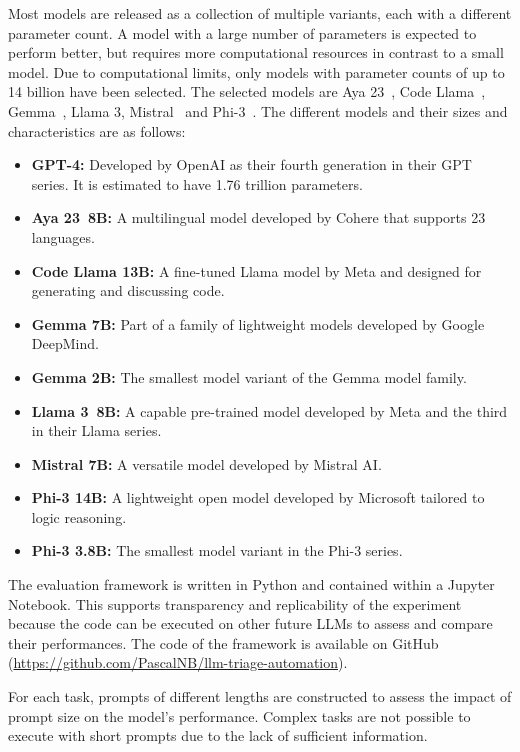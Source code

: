 Most models are released as a collection of multiple variants, each with a different parameter count.
A model with a large number of parameters is expected to perform better, but requires more computational resources
in contrast to a small model.
Due to computational limits, only models with parameter counts of up to 14 billion have been selected.
The selected models are Aya 23\ \citep{aryabumi2024aya}, Code Llama\ \citep{roziere2023code},
Gemma\ \citep{team2024gemma}, Llama 3, Mistral\ \citep{jiang2023mistral} and Phi-3\ \citep{abdin2024phi}.
The different models and their sizes and characteristics are as follows:
\begin{itemize}
    \item \textbf{GPT-4:} Developed by OpenAI as their fourth generation in their GPT series.
    It is estimated to have 1.76 trillion parameters.
    \item \textbf{Aya 23\ 8B:} A multilingual model developed by Cohere that supports 23 languages.
    \item \textbf{Code Llama 13B:} A fine-tuned Llama model by Meta and designed for generating and discussing code.
    \item \textbf{Gemma 7B:} Part of a family of lightweight models developed by Google DeepMind.
    \item \textbf{Gemma 2B:} The smallest model variant of the Gemma model family.
    \item \textbf{Llama 3\ 8B:} A capable pre-trained model developed by Meta and the third in their Llama series.
    \item \textbf{Mistral 7B:} A versatile model developed by Mistral AI\@.
    \item \textbf{Phi-3 14B:} A lightweight open model developed by Microsoft tailored to logic reasoning.
    \item \textbf{Phi-3 3.8B:} The smallest model variant in the Phi-3 series.
\end{itemize}

The evaluation framework is written in Python and contained within a Jupyter Notebook.
This supports transparency and replicability of the experiment because the code can be executed on other future LLMs to
assess and compare their performances.
The code of the framework is available on GitHub (\url{https://github.com/PascalNB/llm-triage-automation}).

For each task, prompts of different lengths are constructed to assess the impact of prompt size on the model's
performance.
Complex tasks are not possible to execute with short prompts due to the lack of sufficient information.

